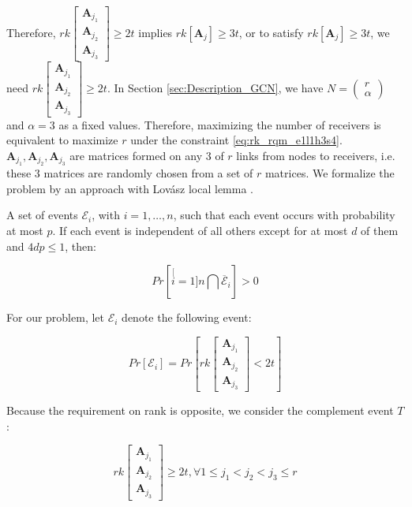 Therefore, $rk\left[\begin{array}{c}
\boldsymbol{A}_{j_{1}}\\
\boldsymbol{A}_{j_{2}}\\
\boldsymbol{A}_{j_{3}}
\end{array}\right]\geq2t$ implies $rk\left[\boldsymbol{A}_{j}\right]\geq3t$, or to satisfy
$rk\left[\boldsymbol{A}_{j}\right]\geq3t$, we need $rk\left[\begin{array}{c}
\boldsymbol{A}_{j_{1}}\\
\boldsymbol{A}_{j_{2}}\\
\boldsymbol{A}_{j_{3}}
\end{array}\right]\geq2t$. In Section \ref{sec:Description_GCN}, we have $N=\left(\begin{array}{c}
r\\
\alpha
\end{array}\right)$ and $\alpha=3$ as a fixed values. Therefore, maximizing the number
of receivers is equivalent to maximize $r$ under the constraint \ref{eq:rk_rqm_e1l1h3s4}.
$\boldsymbol{A}_{j_{1}},\boldsymbol{A}_{j_{2}},\boldsymbol{A}_{j_{3}}$
are matrices formed on any 3 of $r$ links from nodes to receivers,
i.e. these 3 matrices are randomly chosen from a set of $r$ matrices.
We formalize the problem by an approach with Lov\'asz local lemma
\cite{MosheSchwartz:2018}.
\begin{thm}
\label{thm:LLL} \cite{Schwarz:2013}

A set of events $\mathcal{E}_{i}$, with $i=1,\ldots,n$, such that
each event occurs with probability at most $p$. If each event is
independent of all others except for at most $d$ of them and $4dp\leq1$,
then:

\[
Pr\left[\stackrel[i=1]{n}{\bigcap}\overline{\mathcal{E}}_{i}\right]>0
\]
\end{thm}
For our problem, let $\mathcal{E}_{i}$ denote the following event:

\[
Pr\left[\mathcal{E}_{i}\right]=Pr\left[rk\left[\begin{array}{c}
\boldsymbol{A}_{j_{1}}\\
\boldsymbol{A}_{j_{2}}\\
\boldsymbol{A}_{j_{3}}
\end{array}\right]<2t\right]
\]

Because the requirement on rank is opposite, we consider the complement
event $T$:

\[
rk\left[\begin{array}{c}
\boldsymbol{A}_{j_{1}}\\
\boldsymbol{A}_{j_{2}}\\
\boldsymbol{A}_{j_{3}}
\end{array}\right]\geq2t,\forall1\leq j_{1}<j_{2}<j_{3}\leq r
\]

